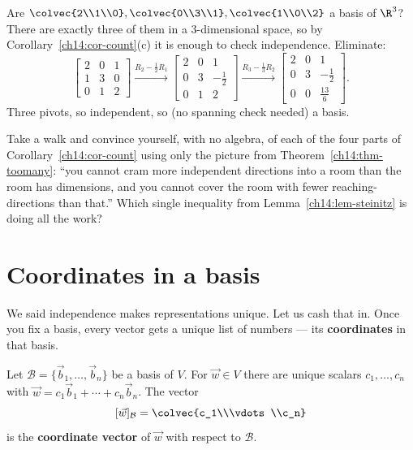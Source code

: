 \begin{example}
\label{ch14:ex-count}
Are $\colvec{2\\1\\0},\colvec{0\\3\\1},\colvec{1\\0\\2}$ a basis of $\R^3$? There
are exactly three of them in a $3$-dimensional space, so by
Corollary~\ref{ch14:cor-count}(c) it is enough to check independence. Eliminate:
\[
  \begin{bmatrix} 2 & 0 & 1\\ 1 & 3 & 0\\ 0 & 1 & 2\end{bmatrix}
  \xrightarrow{R_2-\frac12 R_1}
  \begin{bmatrix} 2 & 0 & 1\\ 0 & 3 & -\frac12\\ 0 & 1 & 2\end{bmatrix}
  \xrightarrow{R_3-\frac13 R_2}
  \begin{bmatrix} 2 & 0 & 1\\ 0 & 3 & -\frac12\\ 0 & 0 & \frac{13}{6}\end{bmatrix}.
\]
Three pivots, so independent, so (no spanning check needed) a basis.
\end{example}

\begin{walkbox}
Take a walk and convince yourself, with no algebra, of each of the four parts of
Corollary~\ref{ch14:cor-count} using only the picture from
Theorem~\ref{ch14:thm-toomany}: ``you cannot cram more independent directions
into a room than the room has dimensions, and you cannot cover the room with
fewer reaching-directions than that.'' Which single inequality from
Lemma~\ref{ch14:lem-steinitz} is doing all the work?
\end{walkbox}

\section{Coordinates in a basis}
\label{ch14:coords}

We said independence makes representations unique. Let us cash that in. Once you
fix a basis, every vector gets a unique list of numbers --- its
\textbf{coordinates} in that basis.

\begin{definition}[Coordinates]
\label{ch14:def-coords}
Let $\mathcal B = \{\vec{b}_1,\dots,\vec{b}_n\}$ be a basis of $V$. For $\vec{w}
\in V$ there are unique scalars $c_1,\dots,c_n$ with $\vec{w} = c_1\vec{b}_1 +
\cdots + c_n\vec{b}_n$. The vector
\[
  [\vec{w}]_{\mathcal B} = \colvec{c_1\\\vdots\\c_n}
\]
is the \textbf{coordinate vector} of $\vec{w}$ with respect to $\mathcal B$.
\end{definition}

